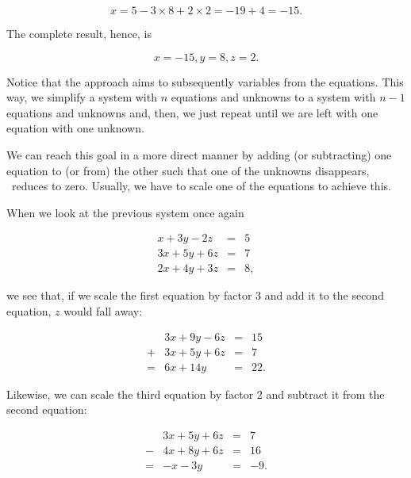 \documentclass[tikz]{scrreprt}
\begin{document}
\begin{equation}
x = 5 - 3\times 8 + 2\times 2 = -19 + 4 = -15.
\end{equation}

The complete result, hence, is 

\[
x=-15, y=8, z=2.
\]

Notice that the approach aims to subsequently 
 variables from the equations.
This way, we simplify a system with $n$ equations 
and unknowns to a system with $n-1$ equations and unknowns
and, then, we just repeat until we are left with
one equation with one unknown.

We can reach this goal in a more direct manner
by adding (or subtracting) one equation to (or from)
the other such that one of the unknowns disappears,
\ie\ reduces to zero. Usually, we have to scale
one of the equations to achieve this.

When we look at the previous system once again

\begin{equation}
\begin{array}{lcl}
 x + 3y - 2z & = &  5\\
3x + 5y + 6z & = &  7\\
2x + 4y + 3z & = &  8,
\end{array}
\end{equation}

we see that, if we scale the first equation by factor 3
and add it to the second equation, $z$ would fall away:

\begin{equation}\label{eq:linPen1}
\begin{array}{clcl}
  & 3x +  9y  - 6z & = & 15\\
+ & 3x +  5y  + 6z & = &  7\\
= & 6x + 14y       & = & 22.
\end{array}
\end{equation}

Likewise, we can scale the third equation by factor 2
and subtract it from the second equation:

\begin{equation}\label{eq:linPen2}
\begin{array}{clcl}
  & 3x + 5y  + 6z & = &  7\\
- & 4x + 8y  + 6z & = & 16\\
= & -x - 3y       & = & -9.
\end{array}
\end{equation}
\end{document}
